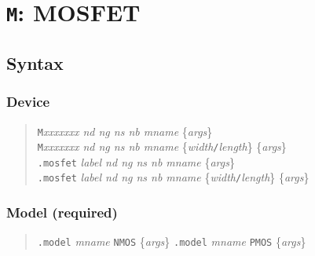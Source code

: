 %
%
%
%
\section{{\tt M}: MOSFET}
\subsection{Syntax}
\subsubsection{Device}
\begin{verse}
{\tt M}{\it xxxxxxx nd ng ns nb mname} \{{\it args}\}\\
{\tt M}{\it xxxxxxx nd ng ns nb mname}
	\{{\it width}{\tt /}{\it length}\} \{{\it args}\}\\
{\tt .mosfet} {\it label nd ng ns nb mname} \{{\it args}\}\\
{\tt .mosfet} {\it label nd ng ns nb mname}
	\{{\it width}{\tt /}{\it length}\} \{{\it args}\}
\end{verse}
\subsubsection{Model (required)}
\begin{verse}
{\tt .model} {\it mname} {\tt NMOS} \{{\it args}\}
{\tt .model} {\it mname} {\tt PMOS} \{{\it args}\}
\end{verse}
